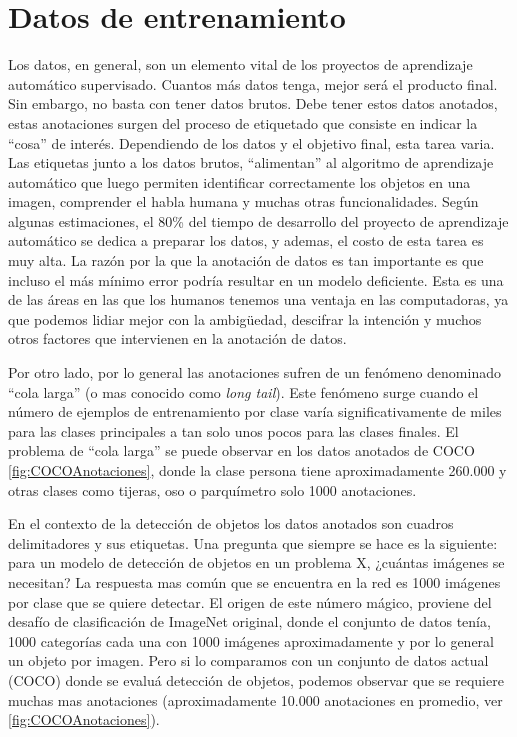 \section{Datos de entrenamiento} \label{sec:datosdeentrenamiento}
Los datos, en general, son un elemento vital de los proyectos de aprendizaje automático supervisado. Cuantos más datos tenga, mejor será el producto final. Sin embargo, no basta con tener datos brutos. Debe tener estos datos anotados, estas anotaciones surgen del proceso de etiquetado que consiste en indicar la ``cosa'' de interés. Dependiendo de los datos y el objetivo final, esta tarea varia. Las etiquetas junto a los datos brutos, ``alimentan'' al algoritmo de aprendizaje automático que luego permiten identificar correctamente los objetos en una imagen, comprender el habla humana y muchas otras funcionalidades. Según algunas estimaciones, el 80\% del tiempo de desarrollo del proyecto de aprendizaje automático se dedica a preparar los datos, y ademas, el costo de esta tarea es muy alta. La razón por la que la anotación de datos es tan importante es que incluso el más mínimo error podría resultar en un modelo deficiente. Esta es una de las áreas en las que los humanos tenemos una ventaja en las computadoras, ya que podemos lidiar mejor con la ambigüedad, descifrar la intención y muchos otros factores que intervienen en la anotación de datos.

Por otro lado, por lo general las anotaciones sufren de un fenómeno denominado ``cola larga'' (o mas conocido como \textit{long tail}). Este fenómeno surge cuando  el número de ejemplos de entrenamiento por clase varía significativamente de miles para las clases principales a tan solo unos pocos para las clases finales. El problema de ``cola larga'' se puede observar en los datos anotados de COCO  \autoref{fig:COCOAnotaciones}, donde la clase persona tiene aproximadamente 260.000 y otras clases como tijeras, oso o parquímetro solo 1000 anotaciones.

En el contexto de la detección de objetos los datos anotados son cuadros delimitadores y sus etiquetas. Una pregunta que siempre se hace es la siguiente: para un modelo de detección de objetos en un problema X, ¿cuántas imágenes se necesitan? La respuesta mas común que se encuentra en la red es 1000 imágenes por clase que se quiere detectar. El origen de este número mágico, proviene del desafío de clasificación de ImageNet original, donde el conjunto de datos tenía, 1000 categorías cada una con 1000 imágenes aproximadamente y por lo general un objeto por imagen. Pero si lo comparamos con un conjunto de datos actual (COCO) donde se evaluá detección de objetos, podemos observar que se requiere muchas mas anotaciones (aproximadamente 10.000 anotaciones en promedio, ver \autoref{fig:COCOAnotaciones}).

